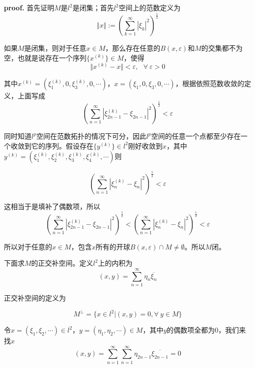 \textbf{proof.} 首先证明$M$是$l^2$是闭集；首先$l^2$空间上的范数定义为
\begin{equation}
    \Vert x\Vert :=\left(\sum_{k=1}^{\infty} |\xi_k|^2\right)^\frac{1}{2}
\end{equation}

如果$M$是闭集，则对于任意$x\in M$，那么存在任意的$B(x,\varepsilon)$和$M$的交集都不为空，也就是说存在一个序列$\{x^{(k)}\}\in M$，使得
\begin{equation}
    \Vert x^{(k)}-x\Vert<\varepsilon,\ \ \ \forall\ \varepsilon>0
\end{equation}

其中$x^{(k)}=(\xi^{(k)}_1,0,\xi^{(k)}_3,0,\cdots)$，$x=(\xi_1,0,\xi_3,0,\cdots)$，根据依照范数收敛的定义，上面写成
\begin{equation}
    \left(\sum_{n=1}^{\infty} |\xi^{(k)}_{2n-1}-\xi_{2n-1}|^2\right)^\frac{1}{2}<\varepsilon
\end{equation}

同时知道$l^p$空间在范数拓扑的情况下可分，因此$l^p$空间的任意一个点都至少存在一个收敛到它的序列。假设存在$\{y^{(k)}\}\in l^2$刚好收敛到$x$，其中$y^{(k)}=(\xi^{(k)}_1,\xi^{(k)}_2,\xi^{(k)}_3,\xi^{(k)}_4,\cdots)$则

\begin{equation}
    \left(\sum_{n=1}^{\infty} |\xi^{(k)}_{n}-\xi_{n}|^2\right)^\frac{1}{2}<\varepsilon
\end{equation}

这相当于是填补了偶数项，所以
\begin{equation}
    \left(\sum_{n=1}^{\infty} |\xi^{(k)}_{2n-1}-\xi_{2n-1}|^2\right)^\frac{1}{2}< \left(\sum_{n=1}^{\infty} |\xi^{(k)}_{n}-\xi_{n}|^2\right)^\frac{1}{2}<\varepsilon
\end{equation}

所以对于任意的$x\in M$，包含$x$所有的开球$B(x,\varepsilon)\cap M\neq \emptyset$。所以$M$闭。

下面求$M$的正交补空间。定义$l^2$上的内积为
\begin{equation}
    (x,y)=\sum_{n=1}^{\infty} \eta_n\overline{\xi_n}
\end{equation}

正交补空间的定义为

\begin{equation}
    M^\perp =\{x\in l^2|(x,y)=0,\forall\ y\in M\}
\end{equation}

令$x=(\xi_1,\xi_2,\cdots)\in l^2$，$y=(\eta_1,\eta_2,\cdots)\in M$，其中$y$的偶数项全都为$0$，我们来找$x$
\begin{equation}
    (x,y)=\sum_{n=1}^{\infty} \sum_{n=1}^{\infty} \eta_{2n-1}\overline{\xi_{2n-1}}=0
\end{equation}

